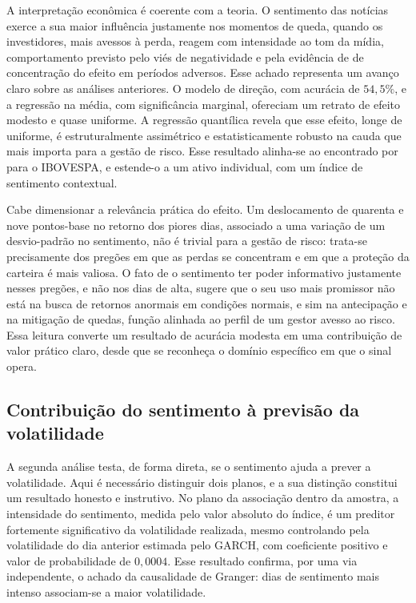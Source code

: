A interpretação econômica é coerente com a teoria. O sentimento das notícias exerce a sua maior influência justamente nos momentos de queda, quando os investidores, mais avessos à perda, reagem com intensidade ao tom da mídia, comportamento previsto pelo viés de negatividade e pela evidência de  de concentração do efeito em períodos adversos. Esse achado representa um avanço claro sobre as análises anteriores. O modelo de direção, com acurácia de $54{,}5\%$, e a regressão na média, com significância marginal, ofereciam um retrato de efeito modesto e quase uniforme. A regressão quantílica revela que esse efeito, longe de uniforme, é estruturalmente assimétrico e estatisticamente robusto na cauda que mais importa para a gestão de risco. Esse resultado alinha-se ao encontrado por  para o IBOVESPA, e estende-o a um ativo individual, com um índice de sentimento contextual.

Cabe dimensionar a relevância prática do efeito. Um deslocamento de quarenta e nove pontos-base no retorno dos piores dias, associado a uma variação de um desvio-padrão no sentimento, não é trivial para a gestão de risco: trata-se precisamente dos pregões em que as perdas se concentram e em que a proteção da carteira é mais valiosa. O fato de o sentimento ter poder informativo justamente nesses pregões, e não nos dias de alta, sugere que o seu uso mais promissor não está na busca de retornos anormais em condições normais, e sim na antecipação e na mitigação de quedas, função alinhada ao perfil de um gestor avesso ao risco. Essa leitura converte um resultado de acurácia modesta em uma contribuição de valor prático claro, desde que se reconheça o domínio específico em que o sinal opera.

\subsection{Contribuição do sentimento à previsão da volatilidade}

A segunda análise testa, de forma direta, se o sentimento ajuda a prever a volatilidade. Aqui é necessário distinguir dois planos, e a sua distinção constitui um resultado honesto e instrutivo. No plano da associação dentro da amostra, a intensidade do sentimento, medida pelo valor absoluto do índice, é um preditor fortemente significativo da volatilidade realizada, mesmo controlando pela volatilidade do dia anterior estimada pelo GARCH, com coeficiente positivo e valor de probabilidade de $0{,}0004$. Esse resultado confirma, por uma via independente, o achado da causalidade de Granger: dias de sentimento mais intenso associam-se a maior volatilidade.

